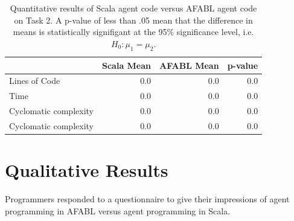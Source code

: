 \begin{center}
\begin{table}[h]
\begin{tabular}{|l|r|r|r|}\hline
                      & Scala Mean & AFABL Mean & p-value \\\hline
Lines of Code         & 0.0        & 0.0        & 0.0 \\
Time                  & 0.0        & 0.0        & 0.0 \\
Cyclomatic complexity & 0.0        & 0.0        & 0.0 \\
Cyclomatic complexity & 0.0        & 0.0        & 0.0 \\\hline
\end{tabular}
\caption{Quantitative results of Scala agent code versus AFABL agent code on Task 2. A p-value of less than .05 mean that the difference in means is statistically signifigant at the 95\% significance level, i.e. $H_0: \mu_1 = \mu_2$.}
\label{tbl:task2-results}
\end{table}
\end{center}

\section{Qualitative Results}

Programmers responded to a questionnaire to give their impressions of agent programming in AFABL versus agent programming in Scala.

